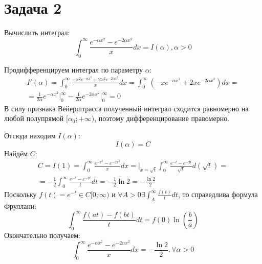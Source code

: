 \documentclass[11pt]{article}
\author{Sergey Makarov}
\date{\today}
\title{}
\begin{document}
\section{Задача 2}
\label{sec:orgc4526dc}
Вычислить интеграл:
$$\int_0^\infty\frac{e^{-\alpha x^2} - e^{-2\alpha x^2}}xdx = I(\alpha), \alpha > 0$$

Продифференцируем интеграл по параметру \(\alpha\):
\begin{multline*}
I'(\alpha) = \int_0^\infty\frac{-x^2e^{-\alpha x^2} + 2x^2e^{-2\alpha x^2}}xdx =
\int_0^\infty(-xe^{-\alpha x^2} + 2xe^{-2\alpha x^2})dx = \\
= \frac1{2\alpha}e^{-\alpha x^2}\bigg|_0^\infty - \frac1{2\alpha}{e^{-2\alpha x^2}\bigg|_0^\infty} = 0
\end{multline*}
В силу признака Вейерштрасса полученный интеграл сходится равномерно на любой полупрямой
\([\alpha_0; +\infty)\), поэтому дифференцирование правомерно.

Отсюда находим \(I(\alpha)\):
$$I(\alpha) = C$$
Найдём \(C\):
\begin{multline*}
C = I(1) = \int_0^\infty\frac{e^{-x^2} - e^{-2x^2}}xdx =\bigg|_{x = \sqrt t}\int_0^\infty\frac{e^{-t} - e^{-2t}}{\sqrt t}d(\sqrt t) = \\
= -\frac12\int_0^\infty\frac{e^{-t} - e^{-2t}}tdt = -\frac12\ln2 = -\frac{\ln2}2
\end{multline*}
Поскольку \(f(t) = e^{-t} \in C[0; \infty)\) и \(\forall A > 0 \exists \int_A^\infty\frac{f(t)}tdt\), то справедлива формула Фруллани:
$$\int_0^\infty\frac{f(at) - f(bt)}tdt = f(0)\ln\left(\frac ba\right)$$
Окончательно получаем:
$$\int_0^\infty\frac{e^{-\alpha x^2} - e^{-2\alpha x^2}}xdx = -\frac{\ln2}2, \forall \alpha > 0$$
\end{document}
